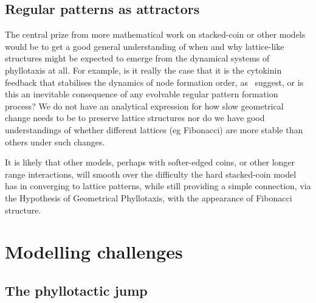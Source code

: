 \subsection{Regular patterns as attractors}
The central prize from more mathematical work on stacked-coin or other models would be to get a good general understanding of when and why lattice-like structures might be expected to emerge from the dynamical systems of phyllotaxis at all. For example, is it really the case that it is the cytokinin feedback that stabilises the dynamics of node formation order, as~\cite{besnardCytokininSignallingInhibitory2014} suggest, or is this an inevitable consequence of any evolvable regular pattern formation process?  We do not have an analytical expression for how slow geometrical change needs to be to preserve lattice structures nor do we have good understandings of whether different lattices (eg Fibonacci) are more stable than others under such changes. 

It is likely that other models, perhaps with softer-edged coins, or other longer range interactions, will smooth over the difficulty the hard stacked-coin model has in converging to lattice patterns, while still providing a simple connection, via the Hypothesis of Geometrical Phyllotaxis, with the appearance of Fibonacci structure. 

\section{Modelling challenges}
\subsection{The phyllotactic jump}

